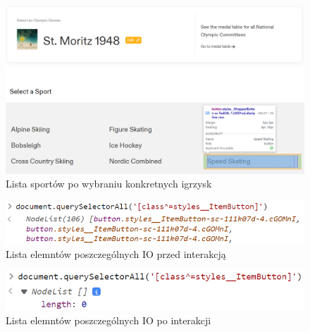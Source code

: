 \documentclass[a4paper,11pt]{article}
\begin{document}
    \begin{figure}[H]
        \centering
        \includegraphics[width=0.8\linewidth]{1-sport-list.png}
        \caption{Lista sportów po wybraniu konkretnych igrzysk}
    \end{figure}

    \begin{figure}[H]
        \centering
        \includegraphics[width=0.5\linewidth]{1-selector-on-games-list.png}
        \caption{Lista elemntów poszczególnych IO przed interakcją}
    \end{figure}

    \begin{figure}[H]
        \centering
        \includegraphics[width=0.5\linewidth]{1-selector-on-sports-list.png}
        \caption{Lista elemntów poszczególnych IO po interakcji}
    \end{figure}
\end{document}
